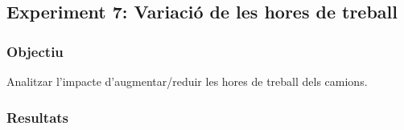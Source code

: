 \subsection{Experiment 7: Variació de les hores de treball}

\subsubsection{Objectiu}
Analitzar l'impacte d'augmentar/reduir les hores de treball dels camions.

\subsubsection{Resultats}



